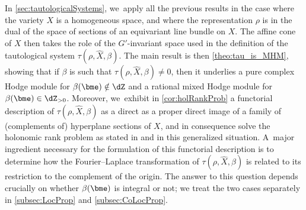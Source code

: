 In \cref{sec:tautologicalSystems}, we~apply all the previous results in the case where the variety $X$ is a homogeneous space, and where the representation $\rho$ is in the dual of the space of sections of an equivariant line bundle on $X$. The affine cone of $X$ then takes the role of the $G'$-invariant space used in the definition of the tautological system $\tau(\rho,\hat{X},\beta)$. The main result is then \cref{theo:tau_is_MHM}, showing that if $\beta$ is such that $\tau(\rho,\hat{X},\beta)\neq 0$, then it underlies a pure complex Hodge module for $\beta(\bme)\notin \dZ$ and a rational mixed Hodge module for $\beta(\bme)\in \dZ_{>0}$. Moreover, we~exhibit in \cref{cor:holRankProb} a functorial description of $\tau(\rho,\hat{X},\beta)$ as a
direct \resp as a proper direct image of a family of (complements of) hyperplane sections of $X$, and in consequence solve the holonomic rank problem as stated in \cite{Bloch_HolRankProb} and \cite{HuangLianZhu} in this generalized situation. A~major ingredient necessary for the formulation of this functorial description is to determine how the Fourier--Laplace transformation of $\tau(\rho,\hat{X},\beta)$ is related to its restriction to the complement of the origin. The answer to this question depends crucially on whether $\beta(\bme)$ is integral or not; we treat the two cases separately in \cref{subsec:LocProp} and \cref{subsec:CoLocProp}.

